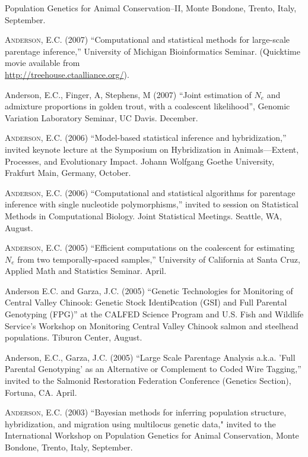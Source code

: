 \documentclass[11pt]{article}
\begin{document}
\begin{description}
Population Genetics for Animal Conservation--II, Monte Bondone, Trento, Italy, September.
\item[] \textsc{Anderson, E.C.} (2007) ``Computational and statistical methods for large-scale parentage inference,'' University of Michigan Bioinformatics Seminar.  (Quicktime movie available from \\
\href{http://treehouse.ctaalliance.org/}{http://treehouse.ctaalliance.org/}).
\item[] {\sc Anderson, E.C.}, Finger, A, Stephens, M (2007) ``Joint estimation of $N_e$ and admixture proportions in golden trout, with a coalescent likelihood'', Genomic Variation Laboratory Seminar, UC Davis. December.
\item[] \textsc{Anderson, E.C.} (2006) ``Model-based statistical inference and hybridization,'' invited keynote lecture at the Symposium on Hybridization in Animals---Extent, Processes, and Evolutionary Impact.  Johann Wolfgang Goethe University, Frakfurt Main, Germany, October.
\item[] \textsc{Anderson, E.C.} (2006) ``Computational and statistical algorithms for parentage inference with single nucleotide polymorphisms,'' invited to session on Statistical Methods in Computational Biology.  Joint Statistical Meetings. Seattle, WA, August.
\item[] \textsc{Anderson, E.C.} (2005) ``Efficient computations on the coalescent for estimating $N_e$ from two temporally-spaced samples,'' University of California at Santa Cruz, Applied Math and Statistics Seminar. April.
\item[] {\sc Anderson E.C.} and Garza, J.C. (2005) ``Genetic Technologies for Monitoring of Central Valley Chinook: Genetic Stock IdentiÞcation (GSI) and Full Parental Genotyping (FPG)'' at the CALFED Science Program and U.S. Fish and Wildlife Service's Workshop on Monitoring Central Valley Chinook salmon and steelhead populations. Tiburon Center, August.
\item[] {\sc Anderson, E.C.}, Garza, J.C. (2005) ``Large Scale Parentage Analysis a.k.a. 'Full Parental Genotyping' as an Alternative or Complement to Coded Wire Tagging,'' invited to the Salmonid Restoration Federation Conference (Genetics Section), Fortuna, CA. April.
\item[] \textsc{Anderson, E.C.} (2003) ``Bayesian methods for inferring population structure,
hybridization, and migration using multilocus genetic data," invited to the International Workshop on
Population Genetics for Animal Conservation, Monte Bondone, Trento, Italy, September.

\end{description}
\end{document}

